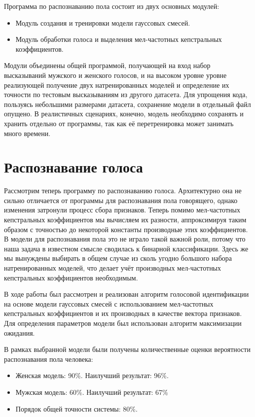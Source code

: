 \documentclass{gost-7-32}
\begin{document}
Программа по распознаванию пола состоит из двух основных модулей:
\begin{itemize}
    \item Модуль создания и тренировки модели гауссовых смесей.
    \item Модуль обработки голоса и выделения мел-частотных кепстральных коэффициентов.
\end{itemize}

Модули объединены общей программой, получающей на вход набор высказываний мужского и женского голосов, и на высоком уровне уровне реализующей получение двух натренированных моделей и определение их точности по тестовым высказываниям из другого датасета.
Для упрощения кода, пользуясь небольшими размерами датасета, сохранение модели в отдельный файл опущено.
В реалистичных сценариях, конечно, модель необходимо сохранять и хранить отдельно от программы, так как её перетренировка может занимать много времени.

\section{Распознавание голоса}

Рассмотрим теперь программу по распознаванию голоса.
Архитектурно она не сильно отличается от программы для распознавания пола говорящего, однако изменения затронули процесс сбора признаков.
Теперь помимо мел-частотных кепстральных коэффициентов мы вычисляем их разности, аппроксимируя таким образом с точностью до некоторой константы производные этих коэффициентов.
В модели для распознавания пола это не играло такой важной роли, потому что наша задача в известном смысле сводилась к бинарной классификации.
Здесь же мы вынуждены выбирать в общем случае из сколь угодно большого набора натренированных моделей, что делает учёт производных мел-частотных кепстральных коэффициентов необходимым.

\newpage
\conclusion

В ходе работы был рассмотрен и реализован алгоритм голосовой идентификации на основе модели гауссовых смесей с использованием мел-частотных кепстральных коэффициентов и их производных в качестве вектора признаков.
Для определения параметров модели был использован алгоритм максимизации ожидания.

В рамках выбранной модели были получены количественные оценки вероятности распознавания пола человека:
\begin{itemize}
    \item Женская модель: 90\%.
        Наилучший результат: 96\%.
    \item Мужская модель: 60\%.
        Наилучший результат: 67\%
    \item Порядок общей точности системы: 80\%.
\end{itemize}
\end{document}
